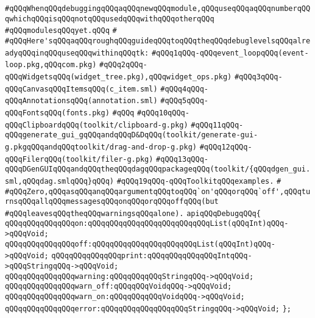 \verb|#qQQqWhenqQQqdebuggingqQQqaqQQqnewqQQqmodule,qQQquseqQQqaqQQqnumberqQQqwhichqQQqisqQQqnotqQQqusedqQQqwithqQQqotherqQQq|\newline
\verb|#qQQqmodulesqQQqyet.qQQq|\newline
\verb|#|\newline
\verb|#qQQqHere'sqQQqaqQQqroughqQQqguideqQQqtoqQQqtheqQQqdebuglevelsqQQqalreadyqQQqinqQQquseqQQqwithinqQQqtk:|\newline
\verb|#qQQq1qQQq-qQQqevent_loopqQQq(event-loop.pkg,qQQqcom.pkg)|\newline
\verb|#qQQq2qQQq-qQQqWidgetsqQQq(widget_tree.pkg),qQQqwidget_ops.pkg)|\newline
\verb|#qQQq3qQQq-qQQqCanvasqQQqItemsqQQq(c_item.sml)|\newline
\verb|#qQQq4qQQq-qQQqAnnotationsqQQq(annotation.sml)|\newline
\verb|#qQQq5qQQq-qQQqFontsqQQq(fonts.pkg)|\newline
\verb|#qQQq|\newline
\verb|#qQQq10qQQq-qQQqClipboardqQQq(toolkit/clipboard-g.pkg)|\newline
\verb|#qQQq11qQQq-qQQqgenerate_gui_gqQQqandqQQqD&DqQQq(toolkit/generate-gui-g.pkgqQQqandqQQqtoolkit/drag-and-drop-g.pkg)|\newline
\verb|#qQQq12qQQq-qQQqFilerqQQq(toolkit/filer-g.pkg)|\newline
\verb|#qQQq13qQQq-qQQqDGenGUIqQQqandqQQqtheqQQqdagqQQqpackageqQQq(toolkit/{qQQqdgen_gui.sml,qQQqdag.smlqQQq}qQQq)|\newline
\verb|#qQQq19qQQq-qQQqToolkitqQQqexamples.|\newline
\verb|#|\newline
\verb|#qQQqZero,qQQqasqQQqanqQQqargumentqQQqtoqQQq`on'qQQqorqQQq`off',qQQqturnsqQQqallqQQqmessagesqQQqonqQQqorqQQqoffqQQq(but|\newline
\verb|#qQQqleavesqQQqtheqQQqwarningsqQQqalone).|\newline
\newline
\newline
\verb|apiqQQqDebugqQQq{|\newline
\newline
\verb|qQQqqQQqqQQqqQQqon:qQQqqQQqqQQqqQQqqQQqqQQqqQQqList(qQQqInt)qQQq->qQQqVoid;|\newline
\verb|qQQqqQQqqQQqqQQqoff:qQQqqQQqqQQqqQQqqQQqqQQqList(qQQqInt)qQQq->qQQqVoid;|\newline
\newline
\verb|qQQqqQQqqQQqqQQqprint:qQQqqQQqqQQqqQQqIntqQQq->qQQqStringqQQq->qQQqVoid;|\newline
\newline
\verb|qQQqqQQqqQQqqQQqwarning:qQQqqQQqqQQqStringqQQq->qQQqVoid;|\newline
\verb|qQQqqQQqqQQqqQQqwarn_off:qQQqqQQqVoidqQQq->qQQqVoid;|\newline
\verb|qQQqqQQqqQQqqQQqwarn_on:qQQqqQQqqQQqVoidqQQq->qQQqVoid;|\newline
\newline
\verb|qQQqqQQqqQQqqQQqerror:qQQqqQQqqQQqqQQqqQQqStringqQQq->qQQqVoid;|\newline
\verb|};|\newline

